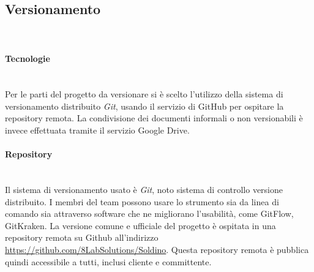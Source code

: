 	\subsection{Versionamento} \mbox{}\\
	\paragraph{Tecnologie} \mbox{}\\
	Per le parti del progetto da versionare si è scelto l'utilizzo della sistema di versionamento distribuito \textit{Git}, usando il servizio di GitHub per ospitare la repository remota. La condivisione dei documenti informali o non versionabili è invece effettuata tramite il servizio Google Drive.
	\paragraph{Repository} \mbox{}\\
	Il sistema di versionamento usato è \textit{Git}, noto sistema di controllo versione distribuito. I membri del team possono usare lo strumento sia da linea di comando sia attraverso software che ne migliorano l'usabilità, come GitFlow, GitKraken. La versione comune e ufficiale del progetto è  ospitata in una repository remota su Github all'indirizzo  
	\url{https://github.com/8LabSolutions/Soldino}. Questa repository remota è pubblica quindi accessibile a tutti, inclusi cliente e committente.
